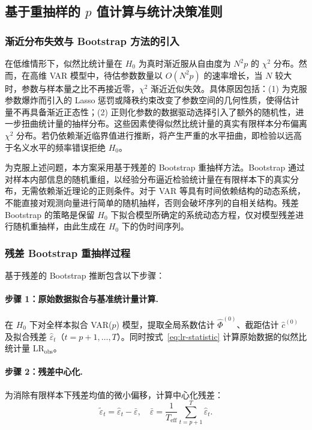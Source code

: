 \subsection{基于重抽样的 \texorpdfstring{$p$}{p} 值计算与统计决策准则}\label{subsec:bootstrap}

\subsubsection{渐近分布失效与 Bootstrap 方法的引入}

在低维情形下，似然比统计量在 $H_0$ 为真时渐近服从自由度为 $N^2 p$ 的 $\chi^2$ 分布。然而，在高维 VAR 模型中，待估参数数量以 $O(N^2 p)$ 的速率增长，当 $N$ 较大时，参数与样本量之比不再接近零，$\chi^2$ 渐近近似失效。具体原因包括：(1) 为克服参数爆炸而引入的 Lasso 惩罚或降秩约束改变了参数空间的几何性质，使得估计量不再具备渐近正态性；(2) 正则化参数的数据驱动选择引入了额外的随机性，进一步扭曲统计量的抽样分布。这些因素使得似然比统计量的真实有限样本分布偏离 $\chi^2$ 分布。若仍依赖渐近临界值进行推断，将产生严重的水平扭曲，即检验以远高于名义水平的频率错误拒绝 $H_0$。

为克服上述问题，本方案采用基于残差的 Bootstrap 重抽样方法。Bootstrap 通过对样本内部信息的随机重组，以经验分布逼近检验统计量在有限样本下的真实分布，无需依赖渐近理论的正则条件。对于 VAR 等具有时间依赖结构的动态系统，不能直接对观测向量进行简单的随机抽样，否则会破坏序列的自相关结构。残差 Bootstrap 的策略是保留 $H_0$ 下拟合模型所确定的系统动态方程，仅对模型残差进行随机重抽样，由此生成在 $H_0$ 下的伪时间序列。

\subsubsection{残差 Bootstrap 重抽样过程}

基于残差的 Bootstrap 推断包含以下步骤：

\paragraph{步骤 1：原始数据拟合与基准统计量计算.}
在 $H_0$ 下对全样本拟合 VAR($p$) 模型，提取全局系数估计 $\hat{\Phi}^{(0)}$、截距估计 $\hat{c}^{(0)}$ 及拟合残差 $\hat{\varepsilon}_t$（$t = p+1, \ldots, T$）。同时按式~\eqref{eq:lr-statistic} 计算原始数据的似然比统计量 $\mathrm{LR}_{\text{obs}}$。

\paragraph{步骤 2：残差中心化.}
为消除有限样本下残差均值的微小偏移，计算中心化残差：
\begin{equation}\label{eq:center-resid}
    \tilde{\varepsilon}_t = \hat{\varepsilon}_t - \bar{\varepsilon}, \quad \bar{\varepsilon} = \frac{1}{T_{\text{eff}}} \sum_{t=p+1}^{T} \hat{\varepsilon}_t.
\end{equation}

